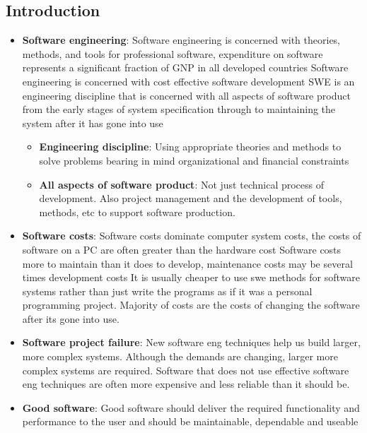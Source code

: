 \documentclass{report}
\begin{document}
    \pagebreak 
    \bigbreak \noindent 
    \subsection{Introduction}
    \begin{itemize}
        \item \textbf{Software engineering}: Software engineering is concerned with theories, methods, and tools for professional software, expenditure on software represents a significant fraction of GNP in all developed countries 
            \bigbreak \noindent 
            Software engineering is concerned with cost effective software development
            \bigbreak \noindent 
            SWE is an engineering discipline that is concerned with all aspects of software product from the early stages of system specification through to maintaining the system after it has gone into use
            \begin{itemize}
                \item \textbf{Engineering discipline}: Using appropriate theories and methods to solve problems bearing in mind organizational and financial constraints
                \item \textbf{All aspects of software product}: Not just technical process of development. Also project management and the development of tools, methods, etc to support software production.
            \end{itemize}
        \item \textbf{Software costs}: Software costs dominate computer system costs, the costs of software on a PC are often greater than the hardware cost
            \bigbreak \noindent 
            Software costs more to maintain than it does to develop, maintenance costs may be several times development costs
            \bigbreak \noindent 
            It is usually cheaper to use swe methods for software systems rather than just write the programs as if it was a personal programming project. Majority of costs are the costs of changing the software after its gone into use.
        \item \textbf{Software project failure}: New software eng techniques help us build larger, more complex systems. Although the demands are changing, larger more complex systems are required.
            \bigbreak \noindent 
            Software that does not use effective software eng techniques are often more expensive and less reliable than it should be.
        \item \textbf{Good software}: Good software should deliver the required functionality and performance to the user and should be maintainable, dependable and useable

\end{itemize}
\end{document}
